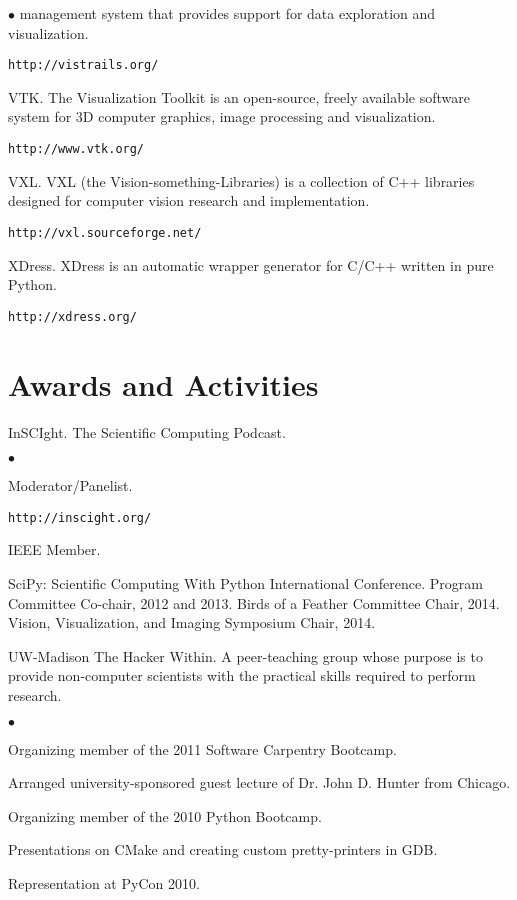 \documentclass[margin,line]{res}
\newenvironment{list2}{
  \begin{list}{$\bullet$}{%
      \setlength{\itemsep}{0in}
      \setlength{\parsep}{0in} \setlength{\parskip}{0in}
      \setlength{\topsep}{0in} \setlength{\partopsep}{0in}
      \setlength{\leftmargin}{0.2in}}}{\end{list}}
\begin{document}
\begin{resume}
\begin{list2}
  management system that provides support for data exploration and visualization.
  \begin{verbatim}http://vistrails.org/\end{verbatim}
\item VTK.  The Visualization Toolkit is an open-source, freely available
  software system for 3D computer graphics, image processing and visualization.
  \begin{verbatim}http://www.vtk.org/\end{verbatim}
\item VXL.  VXL (the Vision-something-Libraries) is a collection of C++
  libraries designed for computer vision research and implementation.
  \begin{verbatim}http://vxl.sourceforge.net/\end{verbatim}
\item XDress.  XDress is an automatic wrapper generator for C/C++ written in
  pure Python.
  \begin{verbatim}http://xdress.org/\end{verbatim}
\end{list2}

\section{\sc Awards and Activities}
InSCIght.  The Scientific Computing Podcast.
\begin{list2}
\item Moderator/Panelist.
\item \verb#http://inscight.org/#
\end{list2}

IEEE Member.

SciPy: Scientific Computing With Python International Conference.  Program
Committee Co-chair, 2012 and 2013. Birds of a Feather Committee Chair, 2014.
Vision, Visualization, and Imaging Symposium Chair, 2014.

UW-Madison The Hacker Within.  A peer-teaching group whose purpose is to provide
non-computer scientists with the practical skills required to perform research.
\begin{list2}
\item Organizing member of the 2011 Software Carpentry Bootcamp.
\item Arranged university-sponsored guest lecture of Dr. John D. Hunter from Chicago.
\item Organizing member of the 2010 Python Bootcamp.
\item Presentations on CMake and creating custom pretty-printers in GDB.
\item Representation at PyCon 2010.
\end{list2}


\end{resume}
\end{document}
